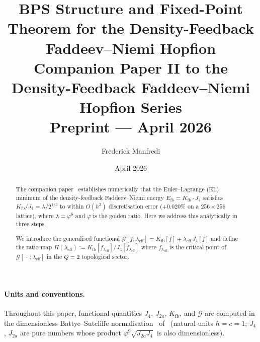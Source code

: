 \documentclass[11pt,a4paper]{article}
\title{\textbf{BPS Structure and Fixed-Point Theorem for the
  Density-Feedback Faddeev--Niemi Hopfion}
\\[0.6em]
{\large Companion Paper II to the Density-Feedback
Faddeev--Niemi Hopfion Series}
\\[0.6em]
\large Preprint --- April 2026}
\author{Frederick Manfredi}
\date{April 2026}
\newcommand{\vp}{\varphi}
\newcommand{\lam}{\lambda}
\newcommand{\leff}{\lambda_{\mathrm{eff}}}
\newcommand{\Kfb}{K_{\mathrm{fb}}}
\newcommand{\Efb}{E_{\mathrm{fb}}}
\newcommand{\Ja}{J_{2a}}
\newcommand{\Jfour}{J_{4}}
\newcommand{\G}{\mathcal{G}}
\theoremstyle{remark}
\begin{document}
\maketitle

\paragraph*{Units and conventions.}
Throughout this paper, functional quantities $\Jfour$, $\Ja$, $\Kfb$,
and $\G$ are computed in the dimensionless Battye--Sutcliffe normalisation~\cite{Battye1998}
of~\cite{Paper1} (natural units $\hbar=c=1$; $J_4$, $J_{2a}$ are pure
numbers whose product $\vp^9\sqrt{\Ja\Jfour}$ is also dimensionless).

\begin{abstract}
The companion paper~\cite{Paper1} establishes numerically that the
Euler--Lagrange (EL) minimum of the density-feedback Faddeev--Niemi
energy $\Efb = \Kfb\cdot\Jfour$ satisfies
$\Kfb/\Jfour = \lam/2^{1/3}$ to within $O(h^2)$ discretisation error
($+0.020\%$ on a $256\times256$ lattice),
where $\lam=\vp^6$ and $\vp$ is the golden ratio.
Here we address this analytically in three steps.

We introduce the generalised functional
$\G[f;\leff] = \Kfb[f] + \leff\,\Jfour[f]$
and define the ratio map
$H(\leff) := \Kfb[f_{\leff}]/\Jfour[f_{\leff}]$
where $f_{\leff}$ is the critical point of $\G[\,\cdot\,;\leff]$
in the $Q=2$ topological sector.


\end{abstract}
\end{document}
